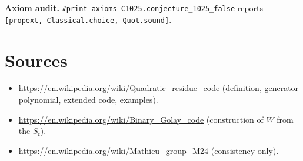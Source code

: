 \documentclass[11pt]{article}
\begin{document}
\textbf{Axiom audit.} \texttt{\#print axioms C1025.conjecture\_1025\_false} reports
\texttt{[propext, Classical.choice, Quot.sound]}.

\section*{Sources}
\begin{itemize}
\item \url{https://en.wikipedia.org/wiki/Quadratic_residue_code} (definition, generator polynomial, extended code,
examples).
\item \url{https://en.wikipedia.org/wiki/Binary_Golay_code} (construction of $W$ from the $S_t$).
\item \url{https://en.wikipedia.org/wiki/Mathieu_group_M24} (consistency only).
\end{itemize}
\end{document}
